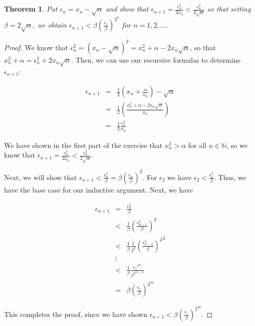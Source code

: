 \documentclass[psamsfonts]{amsart}
\newtheorem{thm}{Theorem}[section]
\theoremstyle{definition}
\theoremstyle{remark}
\numberwithin{equation}{section}
\begin{document}
\begin{thm}
Put $\epsilon_n = x_n - \sqrt{\alpha}$ and show that $\epsilon_{n+1} = \frac{\epsilon_n^2}{2 x_n} < \frac{ \epsilon_n^2}{2 \sqrt{\alpha}}$ so that setting $\beta = 2 \sqrt{\alpha}$, we obtain $\epsilon_{n+1} < \beta \left(\frac{\epsilon_1}{\beta} \right)^{2^n}$ for $n = 1,2, \ldots$. 
\end{thm}

\begin{proof}
We know that $\epsilon_n^2 = (x_n - \sqrt{\alpha})^2 = x_n^2 + \alpha - 2 x_n \sqrt{\alpha}$, so that $x_n^2 + \alpha = \epsilon_n^2 + 2 x_n \sqrt{\alpha}$. Then, we can use our recursive formulas to determine $\epsilon_{n+1}$:

\begin{eqnarray}
\epsilon_{n+1} &=& \frac{1}{2} \left( x_n + \frac{\alpha}{x_n} \right) - \sqrt{\alpha} \\
&=& \frac{1}{2} \left( \frac{x_n^2 + \alpha - 2 x_n \sqrt{\alpha}}{x_n} \right) \\
&=& \frac{1}{2} \frac{\epsilon_n^2}{x_n}
\end{eqnarray}

We have shown in the first part of the exercise that $x_n^2 > \alpha$ for all $n \in \mathbb{N}$, so we know that $\epsilon_{n+1} = \frac{ \epsilon_n^2}{2 x_n} < \frac{ \epsilon_n^2}{2 \sqrt{\alpha}}$. 

Next, we will show that $\epsilon_{n+1} < \frac{ \epsilon_n^2}{\beta} = \beta \left( \frac{ \epsilon_n}{\beta} \right)^2.$ For $\epsilon_2$ we have $\epsilon_2 < \frac{ \epsilon_1^2}{\beta}$. Thus, we have the base case for our inductive argument. Next, we have

\begin{eqnarray}
\epsilon_{n+1} &=& \frac{\epsilon_n^2}{\beta} \\
&<& \frac{1}{\beta} \left( \frac{\epsilon_{n-1}^2}{\beta} \right)^2 \\
&<& \frac{1}{\beta} \frac{1}{\beta^2} {\left( \frac{\epsilon_{n-2}^2}{\beta} \right)^2}^{2} \\
&\vdots& \\
&<& \frac{1}{\beta} \frac{{{\epsilon_1}^2}^n}{{{\beta^2}^{n-1}}} \\
&=& \beta {\left( \frac{\epsilon_1}{\beta} \right)^2}^n
\end{eqnarray}

This completes the proof, since we have shown $\epsilon_{n+1} < \beta { \left( \frac{\epsilon_1}{\beta} \right)^2}^n$.

\end{proof}
\end{document}
